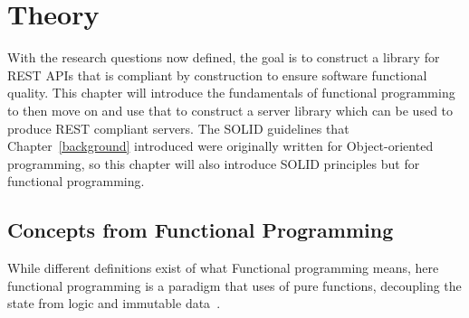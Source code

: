 \chapter{Theory}\label{theory} 

With the research questions now defined, the goal is to construct a library for
REST APIs that is compliant by construction to ensure software functional
quality. This chapter will introduce the fundamentals of functional programming
to then move on and use that to construct a server library which can be used to
produce REST compliant servers. The SOLID guidelines that
Chapter~\ref{background} introduced were originally written for Object-oriented
programming, so this chapter will also introduce SOLID principles but for
functional programming. 

\section{Concepts from Functional Programming}\label{functionalprogramming}

 While different definitions exist of what Functional programming means, here 
 functional programming is a paradigm that uses of pure functions,
 decoupling the state from logic and immutable data~\cite{hughes1989functional}.

